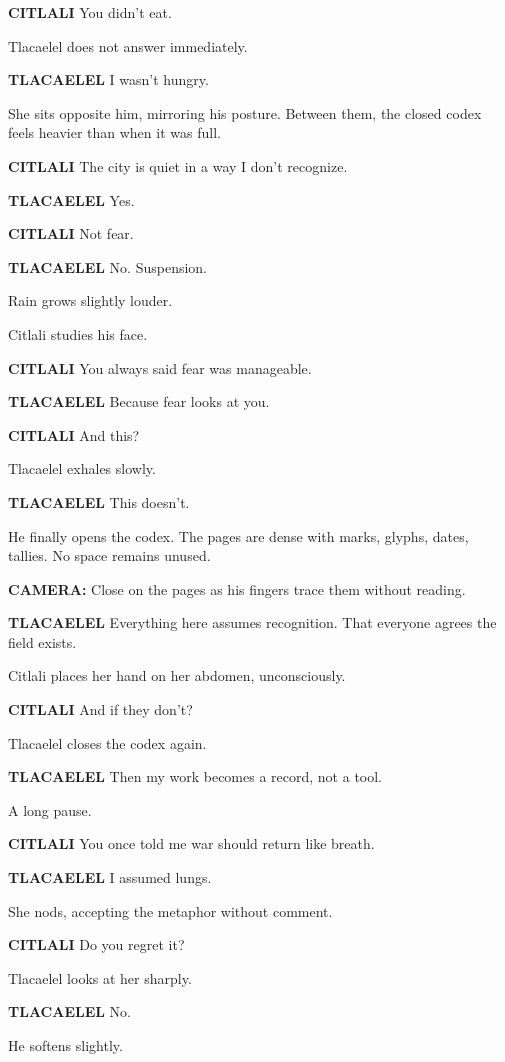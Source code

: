 \documentclass[12pt]{article}
\begin{document}
\textbf{CITLALI}  
You didn’t eat.

Tlacaelel does not answer immediately.

\textbf{TLACAELEL}  
I wasn’t hungry.

She sits opposite him, mirroring his posture. Between them, the closed codex feels heavier than when it was full.

\textbf{CITLALI}  
The city is quiet in a way I don’t recognize.

\textbf{TLACAELEL}  
Yes.

\textbf{CITLALI}  
Not fear.

\textbf{TLACAELEL}  
No.  
Suspension.

Rain grows slightly louder.

Citlali studies his face.

\textbf{CITLALI}  
You always said fear was manageable.

\textbf{TLACAELEL}  
Because fear looks at you.

\textbf{CITLALI}  
And this?

Tlacaelel exhales slowly.

\textbf{TLACAELEL}  
This doesn’t.

He finally opens the codex. The pages are dense with marks, glyphs, dates, tallies. No space remains unused.

\textbf{CAMERA:} Close on the pages as his fingers trace them without reading.

\textbf{TLACAELEL}  
Everything here assumes recognition.  
That everyone agrees the field exists.

Citlali places her hand on her abdomen, unconsciously.

\textbf{CITLALI}  
And if they don’t?

Tlacaelel closes the codex again.

\textbf{TLACAELEL}  
Then my work becomes a record,  
not a tool.

A long pause.

\textbf{CITLALI}  
You once told me war should return  
like breath.

\textbf{TLACAELEL}  
I assumed lungs.

She nods, accepting the metaphor without comment.

\textbf{CITLALI}  
Do you regret it?

Tlacaelel looks at her sharply.

\textbf{TLACAELEL}  
No.

He softens slightly.
\end{document}
